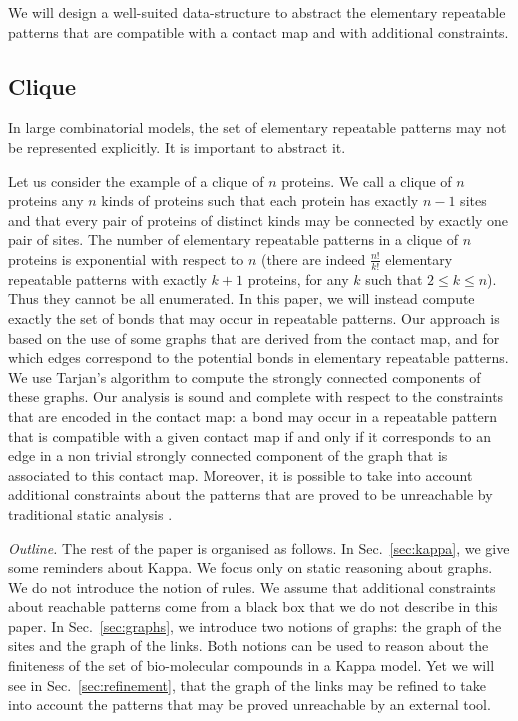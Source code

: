 \documentclass{entcs}
\begin{document}
We will design a well-suited data-structure to abstract the elementary repeatable patterns that are compatible with a contact map and with additional constraints.

\subsection{Clique}

In large combinatorial models, the set of elementary repeatable patterns
may not be represented explicitly. It is important to abstract it.

Let us consider the example of a clique of $n$ proteins.
We call a clique of $n$ proteins any $n$ kinds of proteins such that each protein has exactly $n-1$ sites and that every pair of proteins of distinct kinds may be connected by exactly one pair of sites. The number of elementary repeatable patterns in a clique of $n$ proteins  is exponential with respect to $n$ (there are indeed $\frac{n!}{k!}$  elementary repeatable patterns with exactly $k+1$ proteins, for any $k$ such that $2\leq k \leq n$).
Thus they cannot be all enumerated. In this paper, we will instead compute exactly the set of bonds that may occur in repeatable patterns.
Our approach is based on the use of some graphs that are derived from the contact map, and for which edges correspond to the potential bonds in elementary repeatable patterns. We use Tarjan's algorithm \cite{tarjan} to compute the strongly connected components of these graphs. Our analysis is sound and complete with respect to the constraints that are encoded in the contact map: a bond may occur in a repeatable pattern that is compatible with a given  contact map if and only if it corresponds to an edge in a non trivial strongly connected component of the graph that is associated to this contact map. Moreover, it is possible to take into account additional constraints about the patterns that are proved to be unreachable by traditional static analysis \cite{SASB2016,KaSa}.

\emph{Outline.} The rest of the paper is organised as follows.
In Sec.~\ref{sec:kappa}, we give some reminders about Kappa.
We focus only on static reasoning about graphs. We do not introduce the notion of rules. We assume that
additional constraints about reachable patterns come from a black box that we do not describe in this paper. In Sec.~\ref{sec:graphs}, we introduce two notions of graphs: the graph of the sites and the graph of the links. Both notions can be used to reason about the finiteness of the set of bio-molecular compounds in a Kappa model. Yet we will see in Sec.~\ref{sec:refinement}, that the graph of the links  may be refined to take into account the patterns that may be proved unreachable by an external tool.
\end{document}
